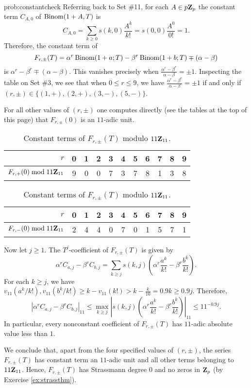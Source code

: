 \begin{sol}{prob:constantcheck} Referring back to Set \#11, for each $A \in p\mathbf{Z}_{p}$ the constant term $C_{A,0}$ of $\mathrm{Binom}(1+A,T)$ is 
\[ C_{A,0} = \sum_{k\ge 0} s(k,0) \frac{A^k}{k!} = s(0,0) \frac{A^0}{0!} = 1. \]
Therefore, the constant term of $$F_{r,\pm}(T) = \alpha^{r}\,\mathrm{Binom}(1+a;T) - \beta^{r}\,\mathrm{Binom}(1+b;T) \mp (\alpha-\beta)$$ is $\alpha^r-\beta^r \mp (\alpha-\beta)$. This vanishes precisely when $\frac{\alpha^r-\beta^r}{\alpha-\beta}=\pm 1$. Inspecting the table on Set \#3, we see that when $0\le r \le 9$, we have $\frac{\alpha^r-\beta^r}{\alpha-\beta}=\pm 1$ if and only if $(r,\pm) \in \{(1,+), (2,+), (3,-), (5,-)\}$. 

For all other values of $(r,\pm)$ one computes directly (see the tables at the top of this page) that $F_{r,\pm}(0)$ is an $11$-adic unit.

\setlength{\tabcolsep}{7pt}
\begin{table}[t]
    \centering
    \begin{tabular}{r || c  c  c  c  c c c c c c}
      $r$ &  0 & 1 & 2 & 3 & 4 & 5 & 6 & 7 & 8 & 9 \\\midrule
      $F_{r,+}(0)\bmod{11\mathbf{Z}_{11}}$    & 9 & 0 & 0 & 7 & 3 & 7 & 8 & 1 & 3 & 8 \\
    \end{tabular}
\vskip 0.1in
    \begin{tabular}{r || c  c c  c  c c c c c c}
      $r$ &  0 & 1 & 2 & 3 & 4 & 5 & 6 & 7 & 8 & 9 \\\midrule
      $F_{r,-}(0)\bmod{11\mathbf{Z}_{11}}$  
      & 2 &4  & 4& 0 & 7 & 0 & 1 & 5 & 7 & 1 \\
    \end{tabular}
    \caption*{Constant terms of $F_{r,\pm}(T)$ modulo $11\mathbf{Z}_{11}$.}
\end{table}
    
Now let $j\ge 1$. The $T^j$-coefficient of $F_{r,\pm}(T)$ is given by 
\[ \alpha^r C_{a,j}-\beta^r C_{b,j}= \sum_{k \ge j} s(k,j) \left(\alpha^r \frac{a^k}{k!} - \beta^r \frac{b^k}{k!}\right).  \]
For each $k\ge j$, we have $v_{11}(a^k/k!), v_{11}(b^k/k!) \ge k - v_{11}(k!) >  k - \frac{k}{10} = 0.9k \ge 0.9j$. Therefore,
\[ |\alpha^r C_{a,j}-\beta^r C  _{b,j}|_{11} \le \max_{k\ge j} \left|s(k,j) \left(\alpha^r \frac{a^k}{k!} - \beta^r \frac{b^k}{k!}\right)\right|_{11} \le 11^{-0.9j}. \]
In particular, every nonconstant coefficient of $F_{r,\pm}(T)$ has $11$-adic absolute value less than $1$.

We conclude that, apart from the four specified values of $(r,\pm)$, the series $F_{r,\pm}(T)$ has constant term an $11$-adic unit and all other terms belonging to $11\mathbf{Z}_{11}$. Hence, $F_{r,\pm}(T)$ has Strassmann degree $0$ and no zeros in $\mathbf{Z}_p$ (by Exercise \ref{ex:strassthm}).
\end{sol}

